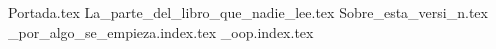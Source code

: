 {Portada.tex}
\tableofcontents
{La_parte_del_libro_que_nadie_lee.tex}
{Sobre_esta_versi_n.tex}
{_por_algo_se_empieza.index.tex}
{_oop.index.tex}
